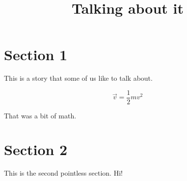 \documentclass[12pt, letterpaper]{article}
\title{Talking about it}
\begin{document}
\maketitle

\section{Section 1}
This is a story that some of us like to talk about.

$$
	\vec{v} = \frac{1}{2}mv^2
$$

That was a bit of math.

\section{Section 2}

This is the second pointless section. Hi!
\end{document}
